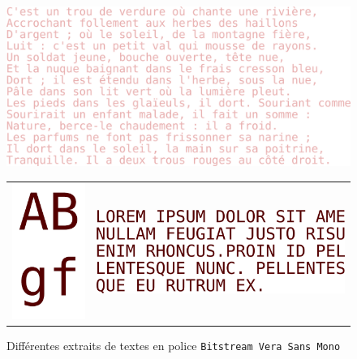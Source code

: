 \documentclass[a4paper,12pt,titlepage]{report}
\begin{document}
		\begin{figure}[h]
			\begin{center}
				\includegraphics[scale=0.15]{../../Data/poesie.png}
			\end{center}
			\begin{center}
				\begin{tabular}{cc}
					\includegraphics[scale=0.2]{../../Data/fullpage_2.png} &
					\includegraphics[scale=0.2]{../../Data/lorem.png}
				\end{tabular}
			\end{center}
			\vspace{-1.5em}
			\caption{Différentes extraits de textes en police \texttt{Bitstream Vera Sans Mono}}
		\end{figure}
		
\end{document}
